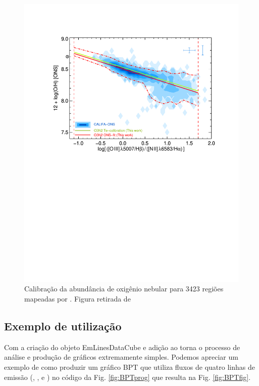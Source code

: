 \begin{figure}
	\centering
	\includegraphics[scale=0.8, trim=2cm 13cm 2cm 3cm, clip]{figuras/O3N2_CALIFA.pdf}
	\caption[Calibração da abundância de oxigênio no gás]{Calibração da abundância de oxigênio 
	nebular	para 3423 regiões \Hii mapeadas por \citet{Sanchez.etal.2013a}. Figura retirada de 
	\citet{Marino.etal.2013a}}
	\label{fig:Marino2013_O3N2}
\end{figure}

\subsection{Exemplo de utilização}
\label{sec:emline:datacube:exemple}

Com a criação do objeto {\sc EmLinesDataCube} e adição ao \pycasso torna o processo de análise e
produção de gráficos extremamente simples. Podemos apreciar um exemplo de como produzir um gráfico
BPT \citep{Baldwin.Phillips.Terlevich.1981a} que utiliza fluxos de quatro linhas de emissão
(\Halpha, \Hbeta, \OIII e \NII) no código da Fig. \ref{fig:BPTprog} que resulta na Fig.
\ref{fig:BPTfig}.

